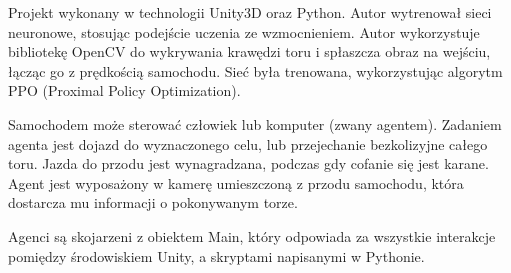 Projekt wykonany w technologii Unity3D oraz Python.
Autor wytrenował sieci neuronowe, stosując podejście uczenia ze wzmocnieniem.
Autor wykorzystuje bibliotekę OpenCV do wykrywania krawędzi toru i spłaszcza obraz na wejściu, łącząc go z prędkością samochodu.
Sieć była trenowana, wykorzystując algorytm PPO (Proximal Policy Optimization).

Samochodem może sterować człowiek lub komputer (zwany agentem).
Zadaniem agenta jest dojazd do wyznaczonego celu, lub przejechanie bezkolizyjne całego toru.
Jazda do przodu jest wynagradzana, podczas gdy cofanie się jest karane.
Agent jest wyposażony w kamerę umieszczoną z przodu samochodu, która dostarcza mu informacji o pokonywanym torze.

Agenci są skojarzeni z obiektem Main, który odpowiada za wszystkie interakcje pomiędzy środowiskiem Unity, a skryptami napisanymi w Pythonie.
 
